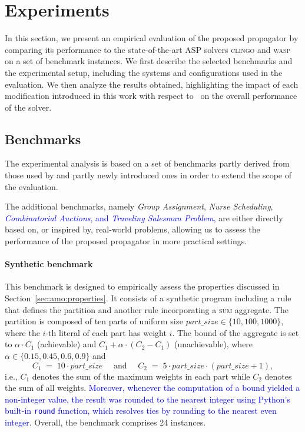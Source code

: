 \documentclass[preprint,authoryear]{elsarticle}
\newcommand{\wasp}{\textsc{wasp}\xspace}
\newcommand{\clingo}{\textsc{clingo}\xspace}
\theoremstyle{definition}
\begin{document}
\section{Experiments}\label{sec:exp}
In this section, we present an empirical evaluation of the proposed propagator by comparing its performance to the state-of-the-art ASP solvers \clingo and \wasp on a set of benchmark instances.  
We first describe the selected benchmarks and the experimental setup, including the systems and configurations used in the evaluation.  
We then analyze the results obtained, highlighting the impact of each modification introduced in this work with respect to~\citep{DBLP:conf/ijcai/AlvianoDFM24} on the overall performance of the solver.

\subsection{Benchmarks}
The experimental analysis is based on a set of benchmarks partly derived from those used by \cite{DBLP:conf/ijcai/AlvianoDFM24} and partly newly introduced ones in order to extend the scope of the evaluation.

The additional benchmarks, namely \emph{Group Assignment}, \emph{Nurse Scheduling}, \textcolor{blue}{\emph{Combinatorial Auctions}, and \textit{Traveling Salesman Problem},} are either directly based on, or inspired by, real-world problems, allowing us to assess the performance of the proposed propagator in more practical settings.

\paragraph{Synthetic benchmark}
This benchmark is designed to empirically assess the properties discussed in Section~\ref{sec:amo:properties}.  
It consists of a synthetic program including a rule that defines the partition and another rule incorporating a \textsc{sum} aggregate.  
The partition is composed of ten parts of uniform size $\mathit{part\_size} \in \{10, 100, 1000\}$, where the $i$-th literal of each part has weight $i$.  
The bound of the aggregate is set to
$\alpha \cdot C_1$ (achievable)
and
$C_1 + \alpha \cdot (C_2 - C_1)$ (unachievable), where
$\alpha \in \{0.15, 0.45, 0.6, 0.9\}$ and
$$
C_1 \;=\;10 \cdot \mathit{part\_size} \quad \text{ and }\quad C_2 \;=\; 5 \cdot \mathit{part\_size} \cdot (\mathit{part\_size} + 1),
$$
i.e., $C_1$ denotes the sum of the maximum weights in each part while $C_2$ denotes the sum of all weights.
\textcolor{blue}{Moreover, whenever the computation of a bound yielded a non-integer value, the result was rounded to the nearest integer using Python's built-in \texttt{round} function, which resolves ties by rounding to the nearest even integer.}
Overall, the benchmark comprises 24 instances.
\end{document}
